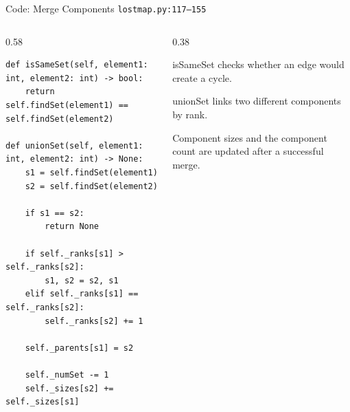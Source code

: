 \documentclass[aspectratio=169,11pt]{beamer}
\begin{document}
\begin{frame}[fragile]{Code: Merge Components}
\scriptsize
{} \texttt{lostmap.py:117--155}

\vspace{0.08cm}
\begin{columns}[T,totalwidth=\textwidth]
\begin{column}{0.58\textwidth}
\begin{lstlisting}[style=cpcode]
def isSameSet(self, element1: int, element2: int) -> bool:
    return self.findSet(element1) == self.findSet(element2)

def unionSet(self, element1: int, element2: int) -> None:
    s1 = self.findSet(element1)
    s2 = self.findSet(element2)

    if s1 == s2:
        return None

    if self._ranks[s1] > self._ranks[s2]:
        s1, s2 = s2, s1
    elif self._ranks[s1] == self._ranks[s2]:
        self._ranks[s2] += 1

    self._parents[s1] = s2

    self._numSet -= 1
    self._sizes[s2] += self._sizes[s1]
\end{lstlisting}
\end{column}
\begin{column}{0.38\textwidth}
\begin{tightitemize}
  \item isSameSet checks whether an edge would create a cycle.
  \item unionSet links two different components by rank.
  \item Component sizes and the component count are updated after a successful merge.
\end{tightitemize}
\end{column}
\end{columns}
\end{frame}
\end{document}
